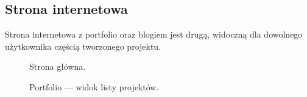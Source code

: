 \documentclass[a4paper, 12pt]{article}
\numberwithin{figure}{section}
\begin{document}
\begin{sloppypar}

\subsection{Strona internetowa} \label{next-use}

Strona internetowa z portfolio oraz blogiem jest drugą, widoczną dla dowolnego użytkownika częścią tworzonego projektu. 

\begin{figure}[H] 
    \centering
   \caption{Strona główna.}
   \label{fig:gotowa-aplikacja-1.jpg}
\end{figure}

\begin{figure}[H] 
    \centering
   \caption{Portfolio --- widok listy projektów.}
   \label{fig:gotowa-aplikacja-2.jpg}
\end{figure}


\end{sloppypar}
\end{document}
